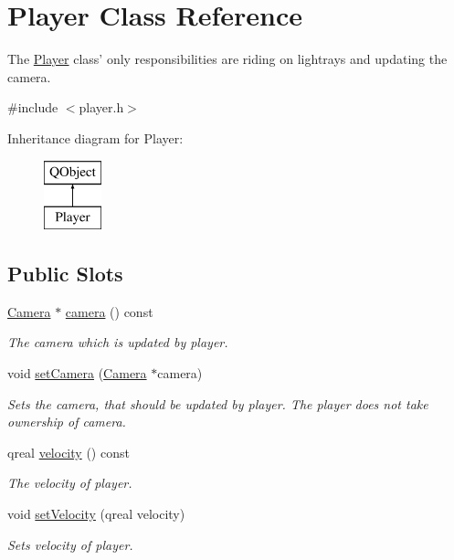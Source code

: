 \hypertarget{class_player}{\section{Player Class Reference}
\label{class_player}
}


The \hyperlink{class_player}{Player} class' only responsibilities are riding on lightrays and updating the camera.  




{\ttfamily \#include $<$player.\+h$>$}

Inheritance diagram for Player\+:\begin{figure}[H]
\begin{center}
\leavevmode
\includegraphics[height=2.000000cm]{class_player}
\end{center}
\end{figure}
\subsection*{Public Slots}
\begin{DoxyCompactItemize}
\item 
\hyperlink{class_camera}{Camera} $\ast$ \hyperlink{class_player_a10605ebcab0fac1b542d1bd8f3d23acd}{camera} () const 
\begin{DoxyCompactList}\small\item\em The camera which is updated by player. \end{DoxyCompactList}\item 
void \hyperlink{class_player_af5e57b3a9719cd999aff21d59355be52}{set\+Camera} (\hyperlink{class_camera}{Camera} $\ast$camera)
\begin{DoxyCompactList}\small\item\em Sets the camera, that should be updated by player. The player does not take ownership of camera. \end{DoxyCompactList}\item 
qreal \hyperlink{class_player_a836e1afdde2c379b964bcf5d3811f0da}{velocity} () const 
\begin{DoxyCompactList}\small\item\em The velocity of player. \end{DoxyCompactList}\item 
void \hyperlink{class_player_ae2d5423c7bf6c6c924a451dc1cdab6aa}{set\+Velocity} (qreal velocity)
\begin{DoxyCompactList}\small\item\em Sets velocity of player. \end{DoxyCompactList}\end{DoxyCompactItemize}
